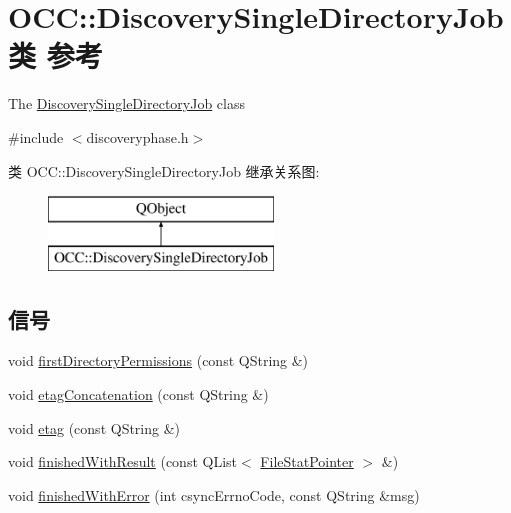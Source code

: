 \hypertarget{class_o_c_c_1_1_discovery_single_directory_job}{}\section{O\+CC\+:\+:Discovery\+Single\+Directory\+Job类 参考}
\label{class_o_c_c_1_1_discovery_single_directory_job}


The \hyperlink{class_o_c_c_1_1_discovery_single_directory_job}{Discovery\+Single\+Directory\+Job} class  




{\ttfamily \#include $<$discoveryphase.\+h$>$}

类 O\+CC\+:\+:Discovery\+Single\+Directory\+Job 继承关系图\+:\begin{figure}[H]
\begin{center}
\leavevmode
\includegraphics[height=2.000000cm]{class_o_c_c_1_1_discovery_single_directory_job}
\end{center}
\end{figure}
\subsection*{信号}
\begin{DoxyCompactItemize}
\item 
void \hyperlink{class_o_c_c_1_1_discovery_single_directory_job_aeb1a3b616cfcf721c4313ac138490e07}{first\+Directory\+Permissions} (const Q\+String \&)
\item 
void \hyperlink{class_o_c_c_1_1_discovery_single_directory_job_ab17ae85cbda6fb4edb325edda3701d8e}{etag\+Concatenation} (const Q\+String \&)
\item 
void \hyperlink{class_o_c_c_1_1_discovery_single_directory_job_a28b023e735b657d9d2f91f147767a823}{etag} (const Q\+String \&)
\item 
void \hyperlink{class_o_c_c_1_1_discovery_single_directory_job_aed3498a0232f02233c9923aa9a290c49}{finished\+With\+Result} (const Q\+List$<$ \hyperlink{class_o_c_c_1_1_file_stat_pointer}{File\+Stat\+Pointer} $>$ \&)
\item 
void \hyperlink{class_o_c_c_1_1_discovery_single_directory_job_abf6b5fb8bcc7e6cc2d46194e495ee121}{finished\+With\+Error} (int csync\+Errno\+Code, const Q\+String \&msg)
\end{DoxyCompactItemize}
